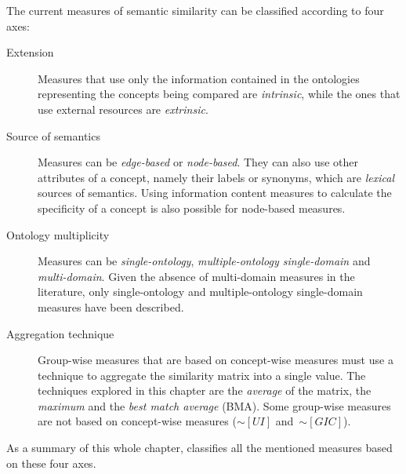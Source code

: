 The current measures of semantic similarity can be classified according to four axes:
\begin{description}
    \item[Extension] Measures that use only the information contained in the ontologies representing the concepts being compared are \emph{intrinsic}, while the ones that use external resources are \emph{extrinsic}.
    
    \item[Source of semantics] Measures can be \emph{edge-based} or \emph{node-based}. They can also use other attributes of a concept, namely their labels or synonyms, which are \emph{lexical} sources of semantics. Using information content measures to calculate the specificity of a concept is also possible for node-based measures.
    
    \item[Ontology multiplicity] Measures can be \emph{single-ontology}, \emph{multiple-ontology single-domain} and \emph{multi-domain}. Given the absence of multi-domain measures in the literature, only single-ontology and multiple-ontology single-domain measures have been described.
    
    \item[Aggregation technique] Group-wise measures that are based on concept-wise measures must use a technique to aggregate the similarity matrix into a single value. The techniques explored in this chapter are the \emph{average} of the matrix, the \emph{maximum} and the \emph{best match average} (BMA). Some group-wise measures are not based on concept-wise measures (\eg $\sim[UI]$ and~$\sim[GIC]$).
\end{description}

As a summary of this whole chapter,  classifies all the mentioned measures based on these four axes.

